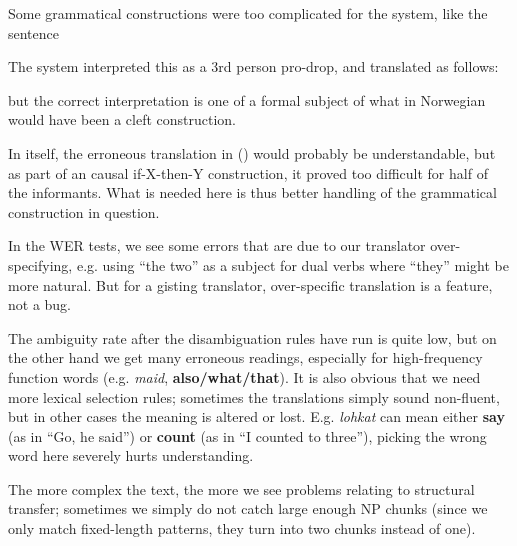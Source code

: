 \documentclass{book}
\begin{document}
Some grammatical constructions were too complicated for the system, 
like the sentence



The system interpreted this as a 3rd person pro-drop, and translated
as follows:

but the correct interpretation is one of a formal subject of
what in Norwegian would have been a cleft construction.

In itself, the erroneous translation in () would probably be
understandable, but as part of an causal if-X-then-Y construction, it
proved too difficult for half of the informants. What is needed here
is thus better handling of the grammatical construction in question.

In the WER tests, we see some errors that are due to our translator
over-specifying, e.g. using ``the two'' as a subject for dual verbs
where ``they'' might be more natural. But for a gisting translator,
over-specific translation is a feature, not a bug.

The ambiguity rate after the disambiguation rules have run is quite
low, but on the other hand we get many erroneous readings, especially
for high-frequency function words (e.g. \textit{maid},
\textbf{also/what/that}). It is also obvious that we need more lexical
selection rules; sometimes the translations simply sound non-fluent,
but in other cases the meaning is altered or lost. E.g.
\textit{lohkat} can mean either \textbf{say} (as in ``Go, he said'')
or \textbf{count} (as in ``I counted to three''), picking the wrong
word here severely hurts understanding.

The more complex the text, the more we see problems relating to
structural transfer; sometimes we simply do not catch large enough NP
chunks (since we only match fixed-length patterns, they turn into two
chunks instead of one).
\end{document}

